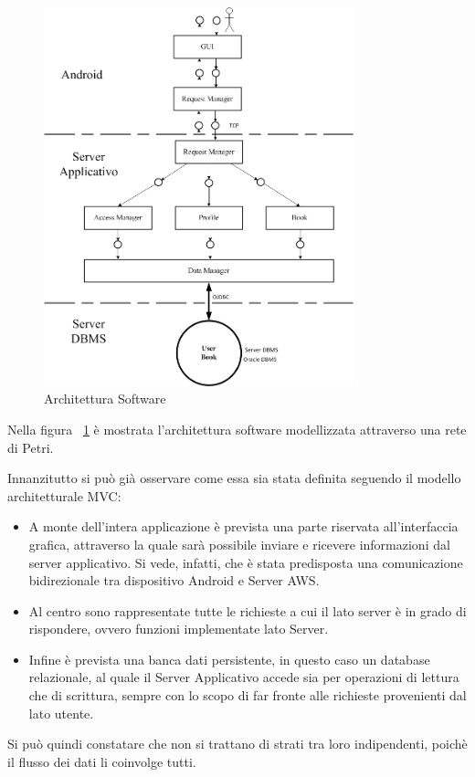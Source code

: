 \begin{figure}[h]
	\centering
	\includegraphics[width=0.8\textwidth]{Immagini/Architettura_Software}
	\caption{Architettura Software}
	\label{fig:ArchitetturaSoftware}
\end{figure}
\newpage
Nella figura ~\ref{fig:ArchitetturaSoftware} è mostrata l'architettura software modellizzata attraverso una rete di Petri.

Innanzitutto si può già osservare come essa sia stata definita seguendo il modello architetturale MVC:
\begin{itemize}
	\item A monte dell'intera applicazione è prevista una parte riservata all'interfaccia grafica, attraverso la quale sarà possibile inviare e ricevere informazioni dal server applicativo. Si vede, infatti, che è stata predisposta una comunicazione bidirezionale tra dispositivo Android e Server AWS.
	\item Al centro sono rappresentate tutte le richieste a cui il lato server è in grado di rispondere, ovvero funzioni implementate lato Server.
	\item Infine è prevista una banca dati persistente, in questo caso un database relazionale, al quale il Server Applicativo accede sia per operazioni di lettura che di scrittura, sempre con lo scopo di far fronte alle richieste provenienti dal lato utente.
\end{itemize}
Si può quindi constatare che non si trattano di strati tra loro indipendenti, poichè il flusso dei dati li coinvolge tutti.